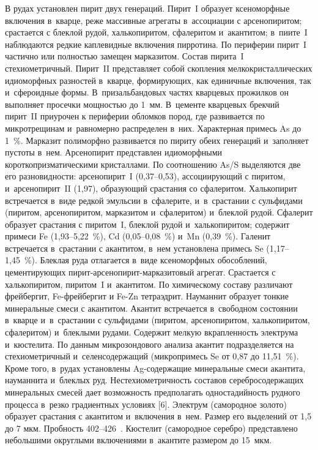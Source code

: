 В рудах установлен пирит двух генераций. Пирит~I образует ксеноморфные включения в~кварце, реже массивные агрегаты в~ассоциации с арсенопиритом; срастается с блеклой рудой, халькопиритом, сфалеритом и~акантитом; в~пиите~I наблюдаются редкие каплевидные включения пирротина. По периферии пирит~I частично или полностью замещен марказитом. Состав пирита~I стехиометричный. Пирит~II представляет собой скопления мелкокристаллических идиоморфных разностей в~кварце, формирующих, как единичные включения, так и~сфероидные формы. В~призальбандовых частях кварцевых прожилков он выполняет просечки мощностью до 1~мм. В~цементе кварцевых брекчий пирит~II приурочен к периферии обломков пород, где развивается по микротрещинам и~равномерно распределен в~них. Характерная примесь As до 1~\%. Марказит полиморфно развивается по пириту обеих генераций и~заполняет пустоты в~нем. Арсенопирит представлен идиоморфными короткопризматическими кристаллами. По соотношению As/S выделяются две его разновидности: арсенопирит~I (0,37--0,53), ассоциирующий с пиритом, и~арсенопирит~II (1,97), образующий срастания со сфалеритом. Халькопирит встречается в~виде редкой эмульсии в~сфалерите, и~в~срастании с сульфидами (пиритом, арсенопиритом, марказитом и~сфалеритом) и~блеклой рудой. Сфалерит образует срастания с пиритом~I, блеклой рудой и~халькопиритом; содержит примеси Fe (1,93--5,22~\%), Cd (0,05--0,08~\%) и~Mn (0,39~\%). Галенит встречается в~срастании с акантитом, в~нем установлена примесь Se (1,17--1,45~\%). Блеклая руда отлагается в~виде ксеноморфных обособлений, цементирующих пирит-арсенопирит-марказитовый агрегат. Срастается с халькопиритом, пиритом~I и~акантитом. По химическому составу различают фрейбергит, Fe-фрейбергит и Fe-Zn тетраэдрит. Науманнит образует тонкие минеральные смеси с акантитом. Акантит встречается в~свободном состоянии в~кварце и~в~срастании с сульфидами (пиритом, арсенопиритом, халькопиритом, сфалеритом) и~блеклыми рудами. Содержит мелкую вкрапленность электрума и~кюстелита. По данным микрозондового анализа акантит подразделяется на стехиометричный и~селенсодержащий (микропримесь Se от 0,87 до 11,51~\%). Кроме того, в~рудах установлены Ag-содержащие минеральные смеси акантита, науманнита и~блеклых руд. Нестехиометричность составов серебросодержащих минеральных смесей дает возможность предполагать одностадийность рудного процесса в~резко градиентных условиях [6]. Электрум (самородное золото) образует срастания с акантитом и~включения в~нем. Размер его выделений от 1,5 до 7 мкм. Пробность 402--426~\permil. Кюстелит (самородное серебро) представлено небольшими округлыми включениями в~акантите размером до 15~мкм.


